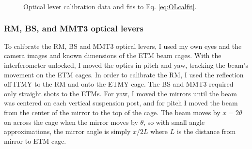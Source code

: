 \begin{figure}
\begin{centering}
\caption[Optical lever calibration data.]{Optical lever calibration data and
  fits to Eq. \ref{eq:OLcalfit}.}
\label{fig:OLcal}
\end{centering}
\end{figure}


\subsubsection{RM, BS, and MMT3 optical levers}
To calibrate the RM, BS and MMT3 optical levers, I used my own eyes
and the camera images and known dimensions of the ETM beam cages. With
the interferometer unlocked, I moved the optics in pitch and yaw,
tracking the beam's movement on the ETM cages. In order to calibrate
the RM, I used the reflection off ITMY to the RM and onto the ETMY
cage. The BS and MMT3 required only straight shots to the ETMs. For
yaw, I moved the mirrors until the beam was centered on each vertical
suspension post, and for pitch I moved the beam from the center of the
mirror to the top of the cage. The beam moves by $x = 2\theta$ on
across the cage when the mirror moves by $\theta$, so with small angle
approximations, the mirror angle is simply $x/2L$ where $L$ is the
distance from mirror to ETM cage.

